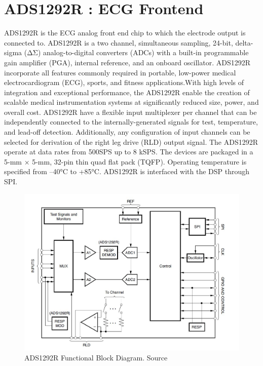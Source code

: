 \section{ADS1292R : ECG Frontend}
ADS1292R is the ECG analog front end chip to which the electrode output is connected to.
ADS1292R is a two channel, simultaneous sampling, 24-bit, delta-sigma (ΔΣ) analog-to-digital converters (ADCs) with a built-in programmable gain amplifier (PGA), internal reference, and an onboard oscillator.  ADS1292R incorporate all features commonly required in portable, low-power medical electrocardiogram (ECG), sports, and fitness applications.With high levels of integration and exceptional performance, the ADS1292R enable the creation of scalable medical instrumentation systems at significantly reduced size, power, and overall cost. ADS1292R have a flexible input multiplexer per channel that can be independently connected to the internally-generated signals for test, temperature, and lead-off detection. Additionally, any configuration of input channels can be selected for derivation of the right leg drive (RLD) output signal. The ADS1292R operate at data rates from 500SPS up to 8 kSPS. The devices are packaged in a 5-mm × 5-mm, 32-pin thin quad flat pack (TQFP). Operating temperature is specified from –40°C to +85°C. ADS1292R is interfaced with the DSP through SPI.
 \begin{figure}[h]
 	\centering
 	\includegraphics[scale = 0.5 ]{ADS1292R.JPG}
 	\caption{ADS1292R Functional Block Diagram. Source \cite{ads}\label{ADS1292R}}
 \end{figure}
 
